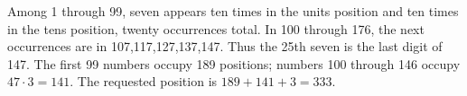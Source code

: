 Among 1 through 99, seven appears ten times in the units position and ten times in the tens position, twenty occurrences total. In 100 through 176, the next occurrences are in 107,117,127,137,147. Thus the 25th seven is the last digit of 147. The first 99 numbers occupy 189 positions; numbers 100 through 146 occupy $47\cdot3=141$. The requested position is $189+141+3=\boxed{333}$.
